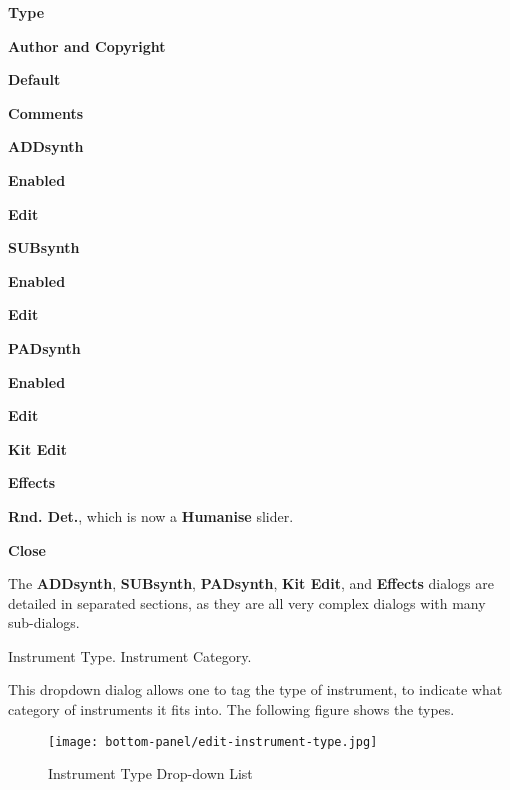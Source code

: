    \begin{enumber}
      \item \textbf{Type}
      \item \textbf{Author and Copyright}
      \item \textbf{Default}
      \item \textbf{Comments}
      \item \textbf{ADDsynth}
      \begin{enumber}
         \item \textbf{Enabled}
         \item \textbf{Edit}
      \end{enumber}
      \item \textbf{SUBsynth}
      \begin{enumber}
         \item \textbf{Enabled}
         \item \textbf{Edit}
      \end{enumber}
      \item \textbf{PADsynth}
      \begin{enumber}
         \item \textbf{Enabled}
         \item \textbf{Edit}
      \end{enumber}
      \item \textbf{Kit Edit}
      \item \textbf{Effects}
      \item \textbf{Rnd. Det.}, which is now a \textbf{Humanise} slider.
      \item \textbf{Close}
   \end{enumber}

   The \textbf{ADDsynth}, \textbf{SUBsynth}, \textbf{PADsynth},
   \textbf{Kit Edit}, and \textbf{Effects}
   dialogs are detailed in separated sections, as they are all
   very complex dialogs with many sub-dialogs.

   \setcounter{ItemCounter}{0}      %

   Instrument Type.
   Instrument Category.

   This dropdown dialog allows one to tag the type of instrument, to
   indicate what category of instruments it fits into.
   The following figure shows the types.

\begin{figure}[H]
   \centering 
   \texttt{[image: bottom-panel/edit-instrument-type.jpg]}
   \caption{Instrument Type Drop-down List}
   \label{fig:instrument_type_dropdown}
\end{figure}

